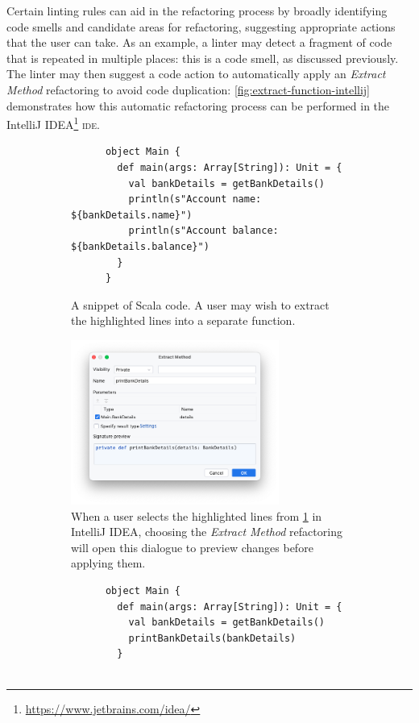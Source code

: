 Certain linting rules can aid in the refactoring process by broadly identifying code smells and candidate areas for refactoring, suggesting appropriate actions that the user can take.
As an example, a linter may detect a fragment of code that is repeated in multiple places: this is a code smell, as discussed previously.
The linter may then suggest a code action to automatically apply an \emph{Extract Method} \cite{fowler_refactoring_2018} refactoring to avoid code duplication: \cref{fig:extract-function-intellij} demonstrates how this automatic refactoring process can be performed in the IntelliJ IDEA\footnote{\url{https://www.jetbrains.com/idea/}} \textsc{ide}.

\begin{figure}[htbp]
  \centering
  \begin{subfigure}{\textwidth}
    \centering
    \begin{verbatim}
      object Main {
        def main(args: Array[String]): Unit = {
          val bankDetails = getBankDetails()
          println(s"Account name: ${bankDetails.name}")
          println(s"Account balance: ${bankDetails.balance}")
        }
      }
    \end{verbatim}
    \caption{A snippet of Scala code. A user may wish to extract the highlighted lines into a separate function.}
    \label{fig:extract-function-intellij-before}
  \end{subfigure}
  \begin{subfigure}{\textwidth}
    \centering
    \includegraphics[width=0.75\textwidth]{background/extract-function-intellij.png}
    \caption{When a user selects the highlighted lines from \cref{fig:extract-function-intellij-before} in IntelliJ IDEA, choosing the \emph{Extract Method} refactoring will open this dialogue to preview changes before applying them.}
    \label{fig:extract-function-intellij-dialogue}
  \end{subfigure}
  \begin{subfigure}{\textwidth}
    \vspace{3ex} %
    \centering
    \begin{verbatim}
      object Main {
        def main(args: Array[String]): Unit = {
          val bankDetails = getBankDetails()
          printBankDetails(bankDetails)
        }


\end{verbatim}
\end{subfigure}
\end{figure}

